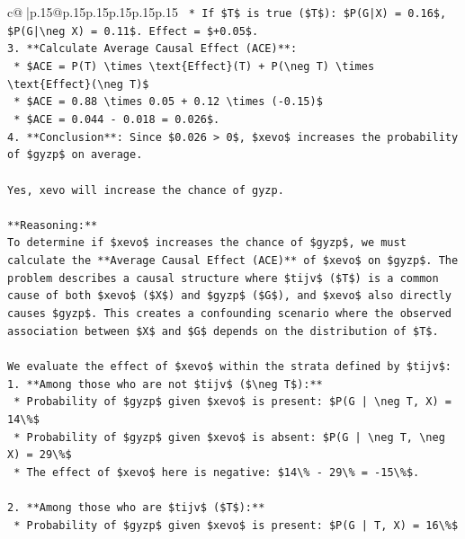 \documentclass{article}
\begin{document}
{\begin{supertabular}{c@{$\;$}|p{.15\linewidth}@{}p{.15\linewidth}p{.15\linewidth}p{.15\linewidth}p{.15\linewidth}p{.15\linewidth}}
{{{\texttt{    *   If \$T\$ is true (\$T\$): \$P(G|X) = 0.16\$, \$P(G|\textbackslash{}neg X) = 0.11\$. Effect = \$+0.05\$.} \\
\texttt{3.  **Calculate Average Causal Effect (ACE)**:} \\
\texttt{    *   \$ACE = P(T) \textbackslash{}times \textbackslash{}text\{Effect\}(T) + P(\textbackslash{}neg T) \textbackslash{}times \textbackslash{}text\{Effect\}(\textbackslash{}neg T)\$} \\
\texttt{    *   \$ACE = 0.88 \textbackslash{}times 0.05 + 0.12 \textbackslash{}times ({-}0.15)\$} \\
\texttt{    *   \$ACE = 0.044 {-} 0.018 = 0.026\$.} \\
\texttt{4.  **Conclusion**: Since \$0.026 > 0\$, \$xevo\$ increases the probability of \$gyzp\$ on average.} \\
\\ 
\texttt{Yes, xevo will increase the chance of gyzp.} \\
\\ 
\texttt{**Reasoning:**} \\
\texttt{To determine if \$xevo\$ increases the chance of \$gyzp\$, we must calculate the **Average Causal Effect (ACE)** of \$xevo\$ on \$gyzp\$. The problem describes a causal structure where \$tijv\$ (\$T\$) is a common cause of both \$xevo\$ (\$X\$) and \$gyzp\$ (\$G\$), and \$xevo\$ also directly causes \$gyzp\$. This creates a confounding scenario where the observed association between \$X\$ and \$G\$ depends on the distribution of \$T\$.} \\
\\ 
\texttt{We evaluate the effect of \$xevo\$ within the strata defined by \$tijv\$:} \\
\texttt{1.  **Among those who are not \$tijv\$ (\$\textbackslash{}neg T\$):**} \\
\texttt{    *   Probability of \$gyzp\$ given \$xevo\$ is present: \$P(G | \textbackslash{}neg T, X) = 14\textbackslash{}\%\$} \\
\texttt{    *   Probability of \$gyzp\$ given \$xevo\$ is absent: \$P(G | \textbackslash{}neg T, \textbackslash{}neg X) = 29\textbackslash{}\%\$} \\
\texttt{    *   The effect of \$xevo\$ here is negative: \$14\textbackslash{}\% {-} 29\textbackslash{}\% = {-}15\textbackslash{}\%\$.} \\
\\ 
\texttt{2.  **Among those who are \$tijv\$ (\$T\$):**} \\
\texttt{    *   Probability of \$gyzp\$ given \$xevo\$ is present: \$P(G | T, X) = 16\textbackslash{}\%\$} \\
}}}
\end{supertabular}}
\end{document}
